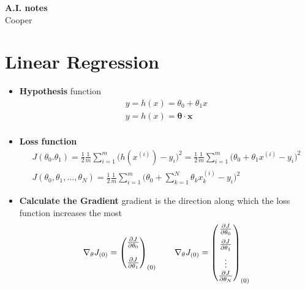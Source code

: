 \documentclass[a4paper,10pt]{article}
\begin{document}
\begin{center}
    {\textbf{\Large{A.I. notes}}}\\
    {\large{Cooper}}
\end{center}

\section{Linear Regression}
\begin{itemize}
    \item \textbf{Hypothesis} function
        \begin{gather*}
            y = h(x) = \theta_0+\theta_1x\\
            y = h(x) = \pmb{\theta}\cdot\pmb{x}\\
        \end{gather*}

        \vspace*{-0.5cm}
    \item \textbf{Loss function}
        \begin{gather*}
            J(\theta_0. \theta_1) = \frac{1}{2}\frac{1}{m}\sum_{i=1}^{m}\Big(h(x^{(i)})-y_i\Big)^2 = \frac{1}{2}\frac{1}{m}\sum_{i=1}^{m}\Big(\theta_0+\theta_1x^{(i)}-y_i\Big)^2\\
            J(\theta_0,\theta_1,\dots,\theta_N) = \frac{1}{2}\frac{1}{m}\sum_{i=1}^{m}\Big(\theta_0+\sum_{k=1}^{N}\theta_kx_k^{(i)}-y_i\Big)^2
        \end{gather*}
    \item \textbf{Calculate the Gradient} gradient is the direction along which the loss function increases the most
        \begin{gather*}
            \nabla_\theta J_{(0)} = 
            \begin{pmatrix}
                \frac{\partial J}{\partial\theta_0} \\[0.4cm]
                \frac{\partial J}{\partial\theta_1} \\
            \end{pmatrix}_{(0)}
            \hspace*{0.7cm}
            \nabla_\theta J_{(0)} = 
            \begin{pmatrix}
                \frac{\partial J}{\partial\theta_0} \\[0.2cm]
                \frac{\partial J}{\partial\theta_1} \\[0.2cm]
                \vdots \\ 
                \frac{\partial J}{\partial\theta_N} \\
            \end{pmatrix}_{(0)}
        \end{gather*}


\end{itemize}
\end{document}
